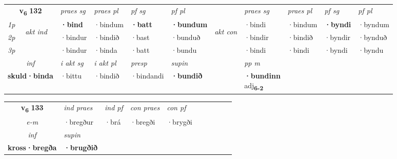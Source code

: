 \noindent
\begin{tabular}{lllllllllll} \toprule
\multicolumn{2}{c}{\textbf{v{\textsubscript{6}}} \Large{\textbf{132}}}  &  \textit{praes sg}  & \textit{praes pl}  &\textit{ pf sg} & \textit{pf pl} &  &  \textit{praes sg}  & \textit{praes pl}  & \textit{pf sg} & \textit{pf pl } \\*
	\cmidrule{3-6} \cmidrule{8-11}
 {\textit{1p}} & \multirow{3}{*}{\begin{turn}{90}\textit{akt ind}\end{turn}} & \textbf{·bind} & ·bindum & \textbf{·batt} & \textbf{·bundum} & \multirow{3}{*}{\begin{turn}{90}\textit{akt con}\end{turn}} &·bindi & ·bindum & \textbf{·byndi} & ·byndum\\*
 {\textit{2p}} &  &  ·bindur  & ·bindið & ·bast & ·bunduð & & ·bindir & ·bindið & ·byndir & ·bynduð \\*
{\textit{3p}} &  & ·bindur & ·binda & ·batt & ·bundu & & ·bindi & ·bindi& ·byndi & ·byndu \\*
\cmidrule{3-6} \cmidrule{8-11}

   \multicolumn{2}{c}{\textit{inf}}  & \textit{i akt sg} & \textit{i akt pl}   & \textit{presp} & \textit{supin}  && \textit{pp m} \\*
  \multicolumn{2}{c}{\textbf{skuld\allowbreak ·binda}} & ·bittu  & ·bindið   & ·bindandi &  \textbf{·bundið}  && \specialcell{\textbf{·bundinn} \\ adj\textbf{\textsubscript{6-2}}} \\*
\end{tabular}

\noindent
\begin{tabular}{lllllllllll} \toprule
\multicolumn{2}{c}{\textbf{v{\textsubscript{6}}} \Large{\textbf{133}}}  &  \textit{ind praes} & \textit{ind pf} & \textit{con praes} & \textit{con pf} \\*
\multicolumn{2}{c}{ \textit{e-m} } & ·bregður & ·brá & ·bregði & ·brygði \\*

\cmidrule{3-3}
   \multicolumn{2}{c}{\textit{inf}}      & \textit{supin}   \\*
  \multicolumn{2}{c}{\textbf{kross\allowbreak ·bregða}}       &  \textbf{·brugðið}   \\*
\end{tabular}

